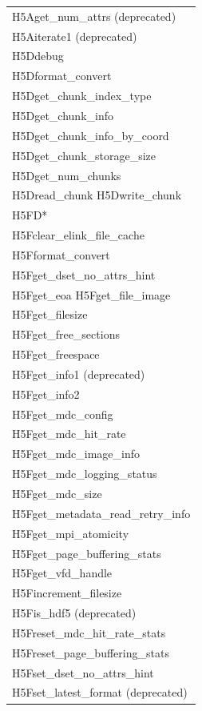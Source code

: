 \begin{longtable}{ |>{\raggedright\arraybackslash}p{\linewidth}| }
    \hline
    H5Aget\_num\_attrs (deprecated) \\
    H5Aiterate1 (deprecated) \\
    \hline
    H5Ddebug \\
    H5Dformat\_convert \\
    H5Dget\_chunk\_index\_type \\
    H5Dget\_chunk\_info \\
    H5Dget\_chunk\_info\_by\_coord \\
    H5Dget\_chunk\_storage\_size \\
    H5Dget\_num\_chunks \\
    H5Dread\_chunk H5Dwrite\_chunk \\
    \hline
    H5FD* \\
    \hline
    H5Fclear\_elink\_file\_cache \\
    H5Fformat\_convert \\
    H5Fget\_dset\_no\_attrs\_hint \\
    H5Fget\_eoa H5Fget\_file\_image \\
    H5Fget\_filesize \\
    H5Fget\_free\_sections \\
    H5Fget\_freespace \\
    H5Fget\_info1 (deprecated) \\
    H5Fget\_info2 \\
    H5Fget\_mdc\_config \\
    H5Fget\_mdc\_hit\_rate \\
    H5Fget\_mdc\_image\_info \\
    H5Fget\_mdc\_logging\_status \\
    H5Fget\_mdc\_size \\
    H5Fget\_metadata\_read\_retry\_info \\
    H5Fget\_mpi\_atomicity \\
    H5Fget\_page\_buffering\_stats \\
    H5Fget\_vfd\_handle \\
    H5Fincrement\_filesize \\
    H5Fis\_hdf5 (deprecated) \\
    H5Freset\_mdc\_hit\_rate\_stats \\
    H5Freset\_page\_buffering\_stats \\
    H5Fset\_dset\_no\_attrs\_hint \\
    H5Fset\_latest\_format (deprecated) \\

\end{longtable}
